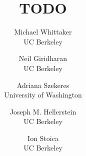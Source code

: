 \documentclass[letterpaper,twocolumn,10pt]{article}
\begin{document}
\date{}

\title{TODO}

\author{%
{\rm Michael Whittaker}\\
UC Berkeley
\and
{\rm Neil Giridharan}\\
UC Berkeley
\and
{\rm Adriana Szekeres}\\
University of Washington
\and
{\rm Joseph M. Hellerstein}\\
UC Berkeley
\and
{\rm Ion Stoica}\\
UC Berkeley
}

\maketitle

{}
{}
{}
{}
{}
{}
{}
{}
{}



\end{document}
